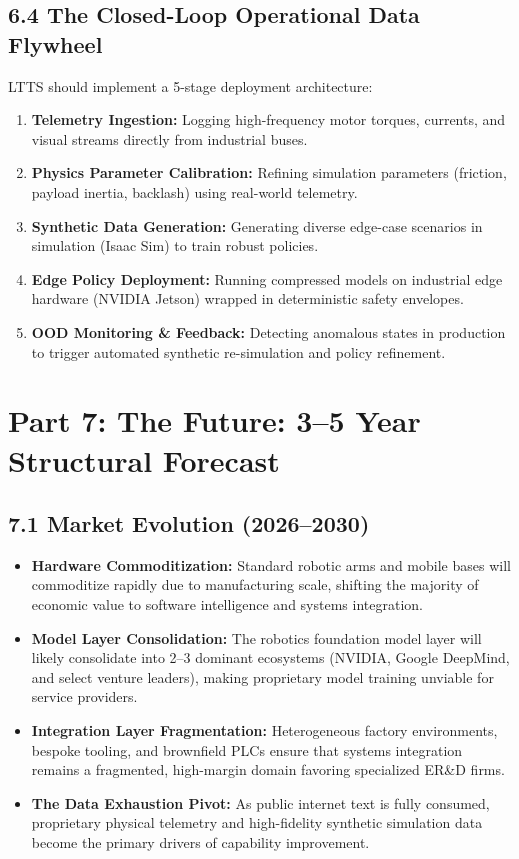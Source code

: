 \documentclass[11pt,a4paper]{article}
\begin{document}
\subsection{6.4 The Closed-Loop Operational Data Flywheel}
LTTS should implement a 5-stage deployment architecture:
\begin{enumerate}
    \item \textbf{Telemetry Ingestion:} Logging high-frequency motor torques, currents, and visual streams directly from industrial buses.
    \item \textbf{Physics Parameter Calibration:} Refining simulation parameters (friction, payload inertia, backlash) using real-world telemetry.
    \item \textbf{Synthetic Data Generation:} Generating diverse edge-case scenarios in simulation (Isaac Sim) to train robust policies.
    \item \textbf{Edge Policy Deployment:} Running compressed models on industrial edge hardware (NVIDIA Jetson) wrapped in deterministic safety envelopes.
    \item \textbf{OOD Monitoring \& Feedback:} Detecting anomalous states in production to trigger automated synthetic re-simulation and policy refinement.
\end{enumerate}

\section{Part 7: The Future: 3--5 Year Structural Forecast}

\subsection{7.1 Market Evolution (2026--2030)}
\begin{itemize}
    \item \textbf{Hardware Commoditization:} Standard robotic arms and mobile bases will commoditize rapidly due to manufacturing scale, shifting the majority of economic value to software intelligence and systems integration.
    \item \textbf{Model Layer Consolidation:} The robotics foundation model layer will likely consolidate into 2--3 dominant ecosystems (NVIDIA, Google DeepMind, and select venture leaders), making proprietary model training unviable for service providers.
    \item \textbf{Integration Layer Fragmentation:} Heterogeneous factory environments, bespoke tooling, and brownfield PLCs ensure that systems integration remains a fragmented, high-margin domain favoring specialized ER\&D firms.
    \item \textbf{The Data Exhaustion Pivot:} As public internet text is fully consumed, proprietary physical telemetry and high-fidelity synthetic simulation data become the primary drivers of capability improvement.
\end{itemize}
\end{document}
